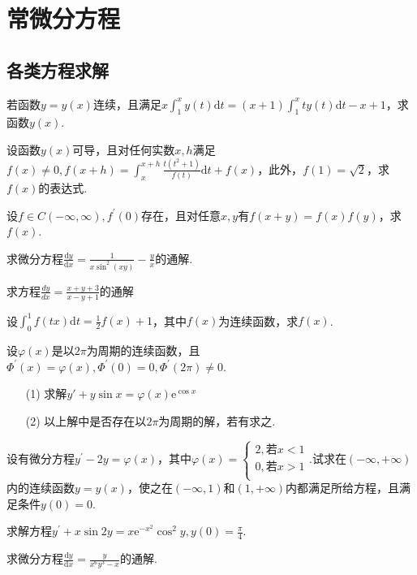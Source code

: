 \chapter{常微分方程}\label{cha:7}
\section{各类方程求解}
\begin{xiti}
	\item 	若函数$y=y(x)$连续，且满足$x \int_{1}^{x} y(t) \mathrm{d} t=(x+1) \int_{1}^{x} t y(t) \mathrm{d} t-x+1$，求函数$y(x)$.
	\item 设函数$y(x)$可导，且对任何实数$x,h$满足$f(x) \neq 0,  f(x+h)=\int_{x}^{x+h} \frac{t\left(t^{2}+1\right)}{f(t)} \mathrm{d} t+f(x)$，此外，$f(1)=\sqrt{2}$，求$f(x)$的表达式.
	
	\item 设$f \in C(-\infty, \infty), f^{\prime}(0)$存在，且对任意$x,y$有$f(x+y)=f(x) f(y)$，求$f(x)$.
	\item 求微分方程$\frac{\mathrm{d} y}{\mathrm{d} x}=\frac{1}{x \sin ^{2}(x y)}-\frac{y}{x}$的通解.
	
	\item 求方程$\frac{d y}{d x}=\frac{x+y+3}{x-y+1}$的通解
	
	\item 	设$\int_{0}^{1} f(t x) \mathrm{d} t=\frac{1}{2} f(x)+1$，其中$f(x)$为连续函数，求$f(x)$.
	
	\item 设$\varphi(x)$是以$2\pi$为周期的连续函数，且$\Phi^{\prime}(x)=\varphi(x),  \Phi^{\prime}(0)=0, \Phi^{\prime}(2 \pi) \neq 0$.
	\begin{enumerate}
		\item [(1)]求解$y'+y \sin x=\varphi(x) \mathrm{e}^{\cos x}$
		\item [(2)]以上解中是否存在以$2\pi$为周期的解，若有求之.
	\end{enumerate}
	
	\item 设有微分方程$y^{\prime}-2 y=\varphi(x)$，其中$\varphi\left(x\right)=\left\{\begin{array}{l}
	2,\textrm{若}x<1\\
	0,\textrm{若}x>1\\
	\end{array}\right. $.试求在$(-\infty,+\infty)$内的连续函数$y=y(x)$，使之在$(-\infty, 1)$和$(1,+\infty)$内都满足所给方程，且满足条件$y(0)=0$.
	\item 求解方程$y^{\prime}+x \sin 2 y=x \mathrm{e}^{-x^{2}} \cos ^{2} y, y(0)=\frac{\pi}{4}$.
	\item 求微分方程$\frac{\mathrm{d} y}{\mathrm{d} x}=\frac{y}{x^{6} y^{3}-x}$的通解.
	

\end{xiti}
